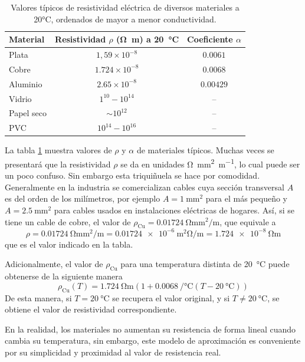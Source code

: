 \begin{table}[htpb]
\centering
\begin{tabular}{l|c|c}
  \textbf{Material} & \textbf{Resistividad $\rho$ (\unit{\ohm\metre}) a \qty{20}{\degreeCelsius}} & \textbf{Coeficiente $\alpha$} \\
\hline
Plata & $1,59 \times 10^{-8}$ & $0.0061$ \\
Cobre & $1.724 \times 10^{-8}$ & $0.0068$ \\
Aluminio & $2.65 \times 10^{-8}$ & $0.00429$ \\
Vidrio & $1^{10} - 10^{14}$ & -- \\
Papel seco & $\sim 10^{12}$ & -- \\
PVC & $10^{14} - 10^{16}$ & -- \\
\end{tabular}
\caption{Valores típicos de resistividad eléctrica de diversos materiales a 20°C, ordenados de mayor a menor conductividad.}
\label{tab:resistividad}
\end{table}

La tabla \ref{tab:resistividad} muestra valores de \(\rho\) y \(\alpha\) de materiales típicos. Muchas veces se presentará que la resistividad \(\rho\) se da en unidades \unit{\ohm \milli\metre\squared\per\metre}, lo cual puede ser un poco confuso. Sin embargo esta triquiñuela se hace por comodidad. Generalmente en la industria se comercializan cables cuya sección transversal \(A\) es del orden de los milímetros, por ejemplo \(A=\qty{1}{\milli\metre\squared}\) para el más pequeño y \(A=\qty{2.5}{\milli\metre\squared}\) para cables usados en instalaciones eléctricas de hogares. Así, si se tiene un cable de cobre, el valor de \(\rho_\text{Cu}=\qty{0.01724}{\ohm\milli\metre\squared\per\metre}\), que equivale a 
\[
  \rho = \qty{0.01724}{\ohm\milli\metre\squared\per\metre} = \qty{0.01724e-6}{\metre\squared}\unit{\ohm\per\metre}= \qty{1.724e-8}{\ohm\metre}
\]
que es el valor indicado en la tabla. 

Adicionalmente, el valor de \(\rho_\text{Cu}\) para una temperatura distinta de \qty{20}{\degreeCelsius} puede obtenerse de la siguiente manera 
\[
  \rho_\text{Cu}(T) = \qty{1.724}{\ohm\metre}(1+\qty{0.0068}{\per\degreeCelsius}(T-\qty{20}{\degreeCelsius}))
\]
De esta manera, si \(T=\qty{20}{\degreeCelsius}\) se recupera el valor original, y si \(T\neq\qty{20}{\degreeCelsius}\), se obtiene el valor de resistividad correspondiente.

En la realidad, los materiales no aumentan su resistencia de forma lineal cuando cambia su temperatura, sin embargo, este modelo de aproximación es conveniente por su simplicidad y proximidad al valor de resistencia real.

